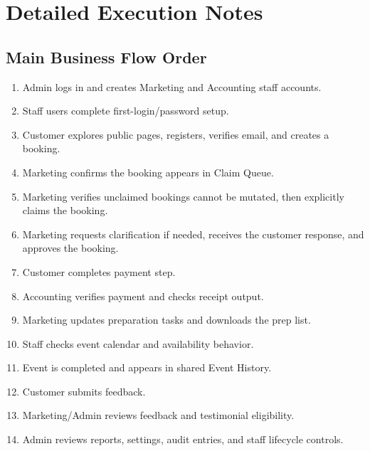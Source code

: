 \documentclass[11pt,a4paper]{article}
\begin{document}
\newpage

\section{Detailed Execution Notes}
\subsection{Main Business Flow Order}
\begin{enumerate}
  \item Admin logs in and creates Marketing and Accounting staff accounts.
  \item Staff users complete first-login/password setup.
  \item Customer explores public pages, registers, verifies email, and creates a booking.
  \item Marketing confirms the booking appears in Claim Queue.
  \item Marketing verifies unclaimed bookings cannot be mutated, then explicitly claims the booking.
  \item Marketing requests clarification if needed, receives the customer response, and approves the booking.
  \item Customer completes payment step.
  \item Accounting verifies payment and checks receipt output.
  \item Marketing updates preparation tasks and downloads the prep list.
  \item Staff checks event calendar and availability behavior.
  \item Event is completed and appears in shared Event History.
  \item Customer submits feedback.
  \item Marketing/Admin reviews feedback and testimonial eligibility.
  \item Admin reviews reports, settings, audit entries, and staff lifecycle controls.
\end{enumerate}
\end{document}
